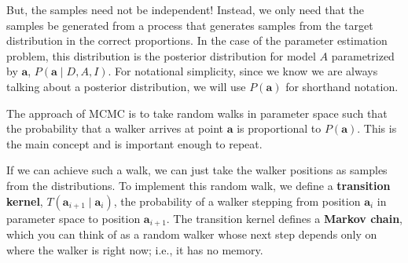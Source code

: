 But, the samples need not be independent!  Instead, we only need that
the samples be generated from a process that generates samples from
the target distribution in the correct proportions.  In the case of
the parameter estimation problem, this distribution is the posterior
distribution for model $A$ parametrized by $\mathbf{a}$,
$P(\mathbf{a}\mid D, A, I)$.  For notational simplicity, since we know
we are always talking about a posterior distribution, we will use
$P(\mathbf{a})$ for shorthand notation.

The approach of MCMC is to take random walks in parameter space such
that the probability that a walker arrives at point $\mathbf{a}$ is
proportional to $P(\mathbf{a})$.  This is the main concept and is
important enough to repeat.


If we can achieve such a walk, we can just take the walker positions
as samples from the distributions.  To implement this random walk, we
define a \textbf{transition kernel},
$T(\mathbf{a}_{i+1}\mid \mathbf{a}_i)$, the probability of a walker
stepping from position $\mathbf{a}_i$ in parameter space to position
$\mathbf{a}_{i+1}$.  The transition kernel defines a \textbf{Markov
  chain}, which you can think of as a random walker whose next step
depends only on where the walker is right now; i.e., it has no memory.

